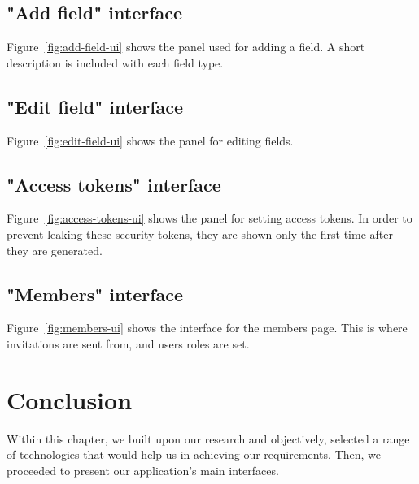 

\subsection{"Add field" interface}
Figure~\ref{fig:add-field-ui} shows the panel used for adding a field.
A short description is included with each field type.



\subsection{"Edit field" interface}
Figure~\ref{fig:edit-field-ui} shows the panel for editing fields.



\subsection{"Access tokens" interface}
Figure~\ref{fig:access-tokens-ui} shows the panel for setting access tokens. In order to prevent leaking these security tokens, they are shown only the first time after they are generated.



\subsection{"Members" interface}
Figure~\ref{fig:members-ui} shows the interface for the members page. This is where invitations are sent from, and users roles are set.


\section{Conclusion}

Within this chapter, we built upon our research and objectively, selected a range of technologies that would help us in achieving our requirements. Then, we proceeded to present our application's main interfaces.